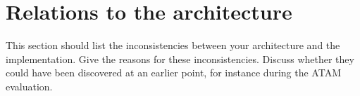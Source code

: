 \section{Relations to the architecture}

This section should list the inconsistencies between your architecture and the implementation. Give the reasons for these inconsistencies. Discuss whether they could have been discovered at an earlier point, for instance during the ATAM evaluation.




